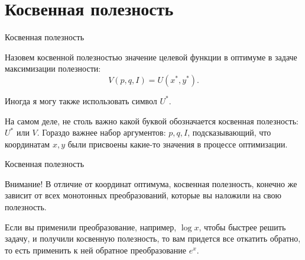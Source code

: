 \documentclass{beamer}
\begin{document}
\section{Косвенная полезность}

\begin{frame}{Косвенная полезность}

\begin{definition}
Назовем \alert{косвенной полезностью} значение целевой функции в оптимуме в задаче максимизации полезности:
$$ V(p,q,I) = U(x^{\ast}, y^{\ast}).$$
\end{definition}
Иногда я могу также использовать символ $U^{\ast}$.

На самом деле, не столь важно какой буквой обозначается косвенная полезность: $U^{\ast}$ или $V$. Гораздо важнее набор аргументов: $p,q, I$, подсказывающий, что координатам $x,y$ были присвоены какие-то значения в процессе оптимизации.
\end{frame}

\begin{frame}{Косвенная полезность}

Внимание! В отличие от координат оптимума, \alert{косвенная полезность, конечно же зависит от всех монотонных преобразований, которые вы наложили} на свою полезность.

Если вы применили преобразование, например, $\log x$, чтобы быстрее решить задачу, и получили косвенную полезность, то вам придется все откатить обратно, то есть применить к ней обратное преобразование $e^x$.

\end{frame}
\end{document}
